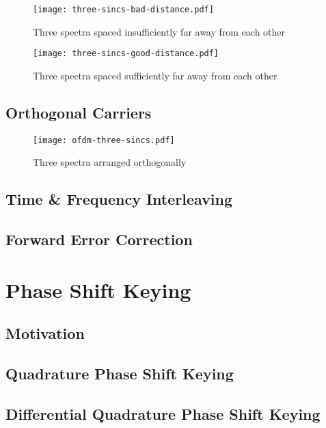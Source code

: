 \documentclass[class=report,11pt,crop=false]{standalone}
\begin{document}
\begin{figure}
    \centering
    \texttt{[image: three-sincs-bad-distance.pdf]}
    \caption{Three spectra spaced insufficiently far away from each other}
    \label{fig:three-sincs-bad-distance}
\end{figure}

\begin{figure}
    \centering
    \texttt{[image: three-sincs-good-distance.pdf]}
    \caption{Three spectra spaced sufficiently far away from each other}
    \label{fig:three-sincs-good-distance}
\end{figure}



\subsection{Orthogonal Carriers}


\begin{figure}
    \centering
    \texttt{[image: ofdm-three-sincs.pdf]}
    \caption{Three spectra arranged orthogonally}
    \label{fig:ofdm-three-sincs}
\end{figure}


\subsection{Time \& Frequency Interleaving}


\subsection{Forward Error Correction}



\section{Phase Shift Keying}
\subsection{Motivation}
\subsection{Quadrature Phase Shift Keying}
\subsection{Differential Quadrature Phase Shift Keying}
\end{document}
